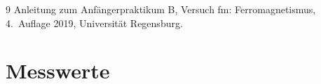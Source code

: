 \documentclass[a4paper,11pt]{article}
\begin{document}
\clearpage

\begin{thebibliography}{9}
   Anleitung zum Anfängerpraktikum B, Versuch \glqq fm\grqq:
    Ferromagnetismus, 4.~Auflage 2019, Universität Regensburg.
\end{thebibliography}

\appendix
\section{Messwerte}



\end{document}

